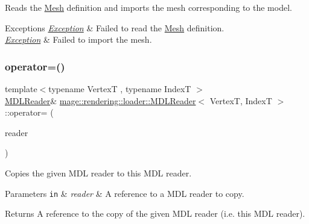 Reads the \mbox{\hyperlink{classmage_1_1rendering_1_1_mesh}{Mesh}} definition and imports the mesh corresponding to the model.


\begin{DoxyExceptions}{Exceptions}
{\em \mbox{\hyperlink{classmage_1_1_exception}{Exception}}} & Failed to read the \mbox{\hyperlink{classmage_1_1rendering_1_1_mesh}{Mesh}} definition. \\
\hline
{\em \mbox{\hyperlink{classmage_1_1_exception}{Exception}}} & Failed to import the mesh. \\
\hline
\end{DoxyExceptions}
\mbox{\label{classmage_1_1rendering_1_1loader_1_1_m_d_l_reader_a76e89824650cdf1d737048ac06862166}} 
\subsubsection{\texorpdfstring{operator=()}{operator=()}\hspace{0.1cm}{\footnotesize\ttfamily [1/2]}}
{\footnotesize\ttfamily template$<$typename VertexT , typename IndexT $>$ \\
\mbox{\hyperlink{classmage_1_1rendering_1_1loader_1_1_m_d_l_reader}{M\+D\+L\+Reader}}\& \mbox{\hyperlink{classmage_1_1rendering_1_1loader_1_1_m_d_l_reader}{mage\+::rendering\+::loader\+::\+M\+D\+L\+Reader}}$<$ VertexT, IndexT $>$\+::operator= (\begin{DoxyParamCaption}\item[{const \mbox{\hyperlink{classmage_1_1rendering_1_1loader_1_1_m_d_l_reader}{M\+D\+L\+Reader}}$<$ VertexT, IndexT $>$ \&}]{reader }\end{DoxyParamCaption})\hspace{0.3cm}{\ttfamily [delete]}}

Copies the given M\+DL reader to this M\+DL reader.


\begin{DoxyParams}[1]{Parameters}
\mbox{\tt in}  & {\em reader} & A reference to a M\+DL reader to copy. \\
\hline
\end{DoxyParams}
\begin{DoxyReturn}{Returns}
A reference to the copy of the given M\+DL reader (i.\+e. this M\+DL reader). 
\end{DoxyReturn}
\mbox{\label{classmage_1_1rendering_1_1loader_1_1_m_d_l_reader_a2afa24fc79ecdcf15f0cbf09f7a78e52}} 
